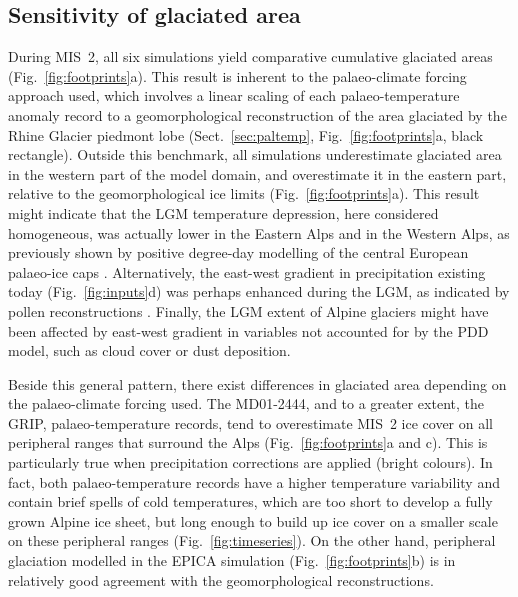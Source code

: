 \documentclass[tc, manuscript]{copernicus}
\begin{document}
\subsection{Sensitivity of glaciated area}
\label{sec:footprints}

    During MIS~2, all six simulations yield comparative cumulative glaciated
    areas (Fig.~\ref{fig:footprints}a). This result is inherent to the
    palaeo-climate forcing approach used, which involves a linear scaling of
    each palaeo-temperature anomaly record to a geomorphological
    reconstruction of the area glaciated by the Rhine Glacier piedmont lobe
    (Sect.~\ref{sec:paltemp}, Fig.~\ref{fig:footprints}a, black rectangle).
    Outside this benchmark, all simulations underestimate glaciated area in the
    western part of the model domain, and overestimate it in the eastern
    part, relative to the geomorphological ice limits
    (Fig.~\ref{fig:footprints}a). This result might indicate that the LGM
    temperature depression, here considered homogeneous, was actually lower in
    the Eastern Alps and in the Western Alps, as previously shown by positive
    degree-day modelling of the central European palaeo-ice caps
    \citep{Heyman.etal.2013}. Alternatively, the east-west
    gradient in precipitation existing today (Fig.~\ref{fig:inputs}d) was
    perhaps enhanced during the LGM, as indicated by pollen reconstructions
    \citep{Wu.etal.2007}. Finally, the LGM extent of Alpine glaciers might have
    been affected by east-west gradient in variables not accounted for
    by the PDD model, such as cloud cover or dust deposition.

    Beside this general pattern, there exist differences in glaciated area
    depending on the palaeo-climate forcing used. The MD01-2444, and to a
    greater extent, the GRIP, palaeo-temperature records, tend to overestimate
    MIS~2 ice cover on all peripheral ranges that surround the Alps
    (Fig.~\ref{fig:footprints}a and c). This is particularly true when
    precipitation corrections are applied (bright colours). In fact, both
    palaeo-temperature records have a higher temperature variability and
    contain brief spells of cold temperatures, which are too short to develop a
    fully grown Alpine ice sheet, but long enough to build up ice cover on a
    smaller scale on these peripheral ranges (Fig.~\ref{fig:timeseries}). On
    the other hand, peripheral glaciation modelled in the EPICA simulation
    (Fig.~\ref{fig:footprints}b) is in relatively good agreement with the
    geomorphological reconstructions.
\end{document}

